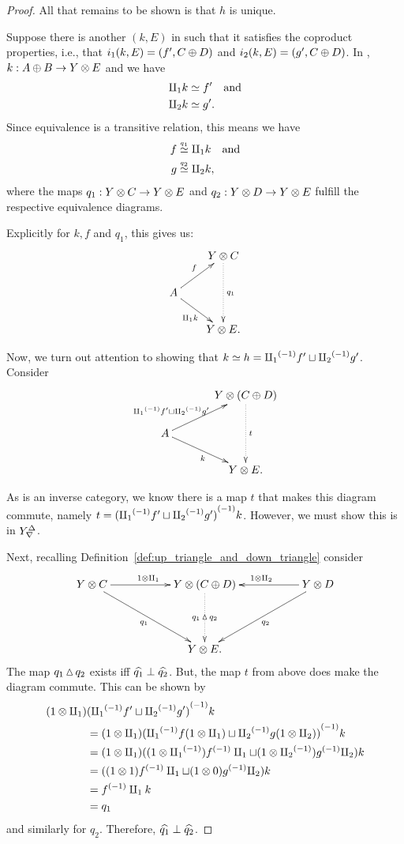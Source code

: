 \begin{proof}
  All that remains to be shown is that $h$ is unique.

  Suppose there is another $(k,E)$ in \Xt such that it satisfies the coproduct properties, i.e.,
  that $i_1 (k,E) = (f',C\oplus D)$ and $i_2 (k,E) = (g',C\oplus D)$. In \X, $k:A\oplus B \to Y \otimes E$ and we have
  \begin{align*}
    \amalg_{1} k &\overset{\scriptscriptstyle }{\simeq} f'\quad\text{and}\\
    \amalg_{2} k &\overset{\scriptscriptstyle }{\simeq} g'.
  \end{align*}
  Since equivalence is a transitive relation, this means we have
  \begin{align*}
    f &\overset{\scriptscriptstyle q_1}{\simeq} \amalg_{1} k\quad\text{and}\\
    g &\overset{\scriptscriptstyle q_2}{\simeq} \amalg_{2} k,
  \end{align*}
  where the maps $q_1: Y\otimes C \to Y\otimes E$ and $q_2:Y\otimes D \to Y\otimes E$ fulfill the respective equivalence diagrams.

  Explicitly for $k, f$ and $q_1$, this gives us:
  \[
    \xymatrix @C=20pt @R=20pt{
      & Y \* C \ar@{.>}[dd]^{q_1}\\
      A \ar[ur]^{f} \ar[dr]_{\cpa k} \\
      & Y\*E.
    }
  \]

  Now, we turn out attention to showing that $k \overset{\scriptscriptstyle }{\simeq} h = {\amalg_{1}}^{(-1)} f' \sqcup {\amalg_{2}}^{(-1)} g'$. Consider
  \begin{equation}
    \xymatrix @C=35pt @R=20pt{
      & Y \* (C\+D)\ar@{.>}[dd]^{t}\\
      A \ar[ur]^(.4){\icpa f' \djoin \icpb g'\ \ \,} \ar[dr]_{k} \\
      & Y\*E.
    }\label{diag:k-equiv-f-djoin-g}
  \end{equation}

  As \X is an inverse category, we know there is a map $t$ that makes this diagram commute,
  namely $t =  {({\amalg_{1}}^{(-1)} f' \sqcup {\amalg_{2}}^{(-1)} g')}^{(-1)}k$. However, we must show this is in ${Y}^{\Delta}_{\nabla}$.

  Next, recalling Definition~\ref{def:up_triangle_and_down_triangle} consider
  \begin{equation*}
    \xymatrix@C+0pt @R+20pt{
      Y\*C\ar[rr]^{1\*\cpa} \ar[drr]_{q_1} &&Y\*(C\+D)   \ar@{.>}[d]|-{q_1\tjup q_2}
        && Y\*D \ar[ll]_{1\*\cpb} \ar[dll]^{q_2}\\
      &&Y\*E.
      }%
  \end{equation*}
  The map $q_1\operatorname{\vartriangle} q_2$ exists iff $\widehat{q_1} \perp \widehat{q_2}$. But, the map $t$ from above
  does make the diagram commute. This can be shown by
  \begin{align*}
    (1\*\cpa)& \inv{(\icpa f' \djoin \icpb g')}k\\
    &=  (1\*\cpa)\inv{(\icpa f(1\*\cpa) \djoin \icpb g(1\*\cpb))}k\\
    &=  (1\*\cpa)((1\*\icpa) \inv{f}\cpa \djoin (1\*\icpb) \inv{g}\cpb) k \\
    &=  ((1\*1) \inv{f}\cpa \djoin (1\*0) \inv{g}\cpb) k \\ %
    &=  \inv{f} \cpa k\\
    &= q_1
  \end{align*}
  and similarly for $q_2$. Therefore,  $\widehat{q_1} \perp \widehat{q_2}$.


\end{proof}
